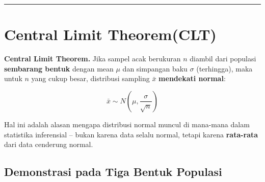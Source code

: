 \documentclass[
  indonesian,
  letterpaper,
]{book}
\begin{document}
\begin{center}\rule{0.5\linewidth}{0.5pt}\end{center}


\chapter{Central Limit Theorem(CLT)}\label{central-limit-theoremclt}

\textbf{Central Limit Theorem.} Jika sampel acak berukuran \(n\) diambil
dari populasi \textbf{sembarang bentuk} dengan mean \(\mu\) dan
simpangan baku \(\sigma\) (terhingga), maka untuk \(n\) yang cukup
besar, distribusi sampling \(\bar{x}\) \textbf{mendekati normal}:

\[
\bar{x} \sim N\left(\mu, \frac{\sigma}{\sqrt{n}}\right)
\]

Hal ini adalah alasan mengapa distribusi normal muncul di mana-mana
dalam statistika inferensial -- bukan karena data selalu normal, tetapi
karena \textbf{rata-rata} dari data cenderung normal.

\section{Demonstrasi pada Tiga Bentuk
Populasi}\label{demonstrasi-pada-tiga-bentuk-populasi}
\end{document}
